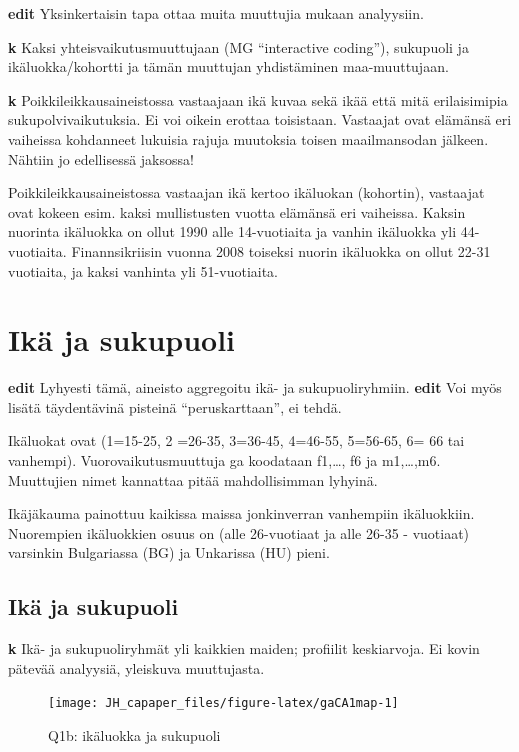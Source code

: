 \documentclass[
  finnish,
]{book}
\begin{document}
\textbf{edit} Yksinkertaisin tapa ottaa muita muuttujia mukaan
analyysiin.

\textbf{k} Kaksi yhteisvaikutusmuuttujaan (MG ``interactive coding''),
sukupuoli ja ikäluokka/kohortti ja tämän muuttujan yhdistäminen
maa-muuttujaan.

\textbf{k} Poikkileikkausaineistossa vastaajaan ikä kuvaa sekä ikää että
mitä erilaisimipia sukupolvivaikutuksia. Ei voi oikein erottaa
toisistaan. Vastaajat ovat elämänsä eri vaiheissa kohdanneet lukuisia
rajuja muutoksia toisen maailmansodan jälkeen. Nähtiin jo edellisessä
jaksossa!

Poikkileikkausaineistossa vastaajan ikä kertoo ikäluokan (kohortin),
vastaajat ovat kokeen esim. kaksi mullistusten vuotta elämänsä eri
vaiheissa. Kaksin nuorinta ikäluokka on ollut 1990 alle 14-vuotiaita ja
vanhin ikäluokka yli 44-vuotiaita. Finannsikriisin vuonna 2008 toiseksi
nuorin ikäluokka on ollut 22-31 vuotiaita, ja kaksi vanhinta yli
51-vuotiaita.

\hypertarget{ikuxe4-ja-sukupuoli}{%
\section{Ikä ja sukupuoli}\label{ikuxe4-ja-sukupuoli}}

\textbf{edit} Lyhyesti tämä, aineisto aggregoitu ikä- ja
sukupuoliryhmiin. \textbf{edit} Voi myös lisätä täydentävinä pisteinä
``peruskarttaan'', ei tehdä.

Ikäluokat ovat (1=15-25, 2 =26-35, 3=36-45, 4=46-55, 5=56-65, 6= 66 tai
vanhempi). Vuorovaikutusmuuttuja ga koodataan f1,\ldots, f6 ja
m1,\ldots,m6. Muuttujien nimet kannattaa pitää mahdollisimman lyhyinä.

Ikäjäkauma painottuu kaikissa maissa jonkinverran vanhempiin
ikäluokkiin. Nuorempien ikäluokkien osuus on (alle 26-vuotiaat ja alle
26-35 - vuotiaat) varsinkin Bulgariassa (BG) ja Unkarissa (HU) pieni.

\hypertarget{ikuxe4-ja-sukupuoli-1}{%
\subsection{Ikä ja sukupuoli}\label{ikuxe4-ja-sukupuoli-1}}

\textbf{k} Ikä- ja sukupuoliryhmät yli kaikkien maiden; profiilit
keskiarvoja. Ei kovin pätevää analyysiä, yleiskuva muuttujasta.

\begin{figure}

{\centering \texttt{[image: JH\_capaper\_files/figure-latex/gaCA1map-1]} 

}

\caption{Q1b: ikäluokka ja sukupuoli}\label{fig:gaCA1map}
\end{figure}
\end{document}
